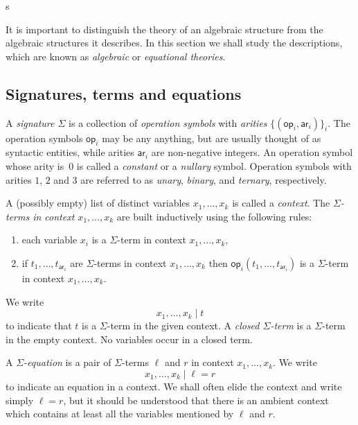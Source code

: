 s\documentclass{amsart}
\newcommand{\family}[2]{\{#1\}_{#2}} %
\newcommand{\op}[1]{\mathsf{op}_{#1}} %
\newcommand{\arity}[1]{\mathsf{ar}_{#1}} %
\begin{document}
It is important to distinguish the theory of an algebraic structure from the
algebraic structures it describes. In this section we shall study the
descriptions, which are known as \emph{algebraic} or \emph{equational theories}.

\subsection{Signatures, terms and equations}
\label{sec:signatures-equations}

A \emph{signature $\Sigma$} is a collection of \emph{operation symbols} with
\emph{arities} $\family{(\op{i}, \arity{i})}{i}$. The operation symbols
$\op{i}$ may be any anything, but are usually thought of as syntactic entities,
while arities $\arity{i}$ are non-negative integers. An operation symbol whose
arity is~$0$ is called a \emph{constant} or a \emph{nullary} symbol. Operation
symbols with arities $1$, $2$ and $3$ are referred to as \emph{unary},
\emph{binary}, and \emph{ternary}, respectively.

A (possibly empty) list of distinct variables $x_1, \ldots, x_k$ is called a
\emph{context}. The \emph{$\Sigma$-terms in context $x_1, \ldots, x_k$} are
built inductively using the following rules:
%
\begin{enumerate}
\item each variable $x_i$ is a $\Sigma$-term in context $x_1, \ldots, x_k$,
\item if $t_1, \ldots, t_{\arity{i}}$ are $\Sigma$-terms in context $x_1, \ldots, x_k$ then
  $\op{i}(t_1, \ldots, t_{\arity{i}})$ is a $\Sigma$-term in context $x_1, \ldots, x_k$.
\end{enumerate}
%
We write
%
\begin{equation*}
  x_1, \ldots, x_k \mid t
\end{equation*}
%
to indicate that $t$ is a $\Sigma$-term in the given context. A \emph{closed
  $\Sigma$-term} is a $\Sigma$-term in the empty context. No variables occur
in a closed term.

A \emph{$\Sigma$-equation} is a pair of $\Sigma$-terms $\ell$ and $r$ in context
$x_1, \ldots, x_k$. We write
%
\begin{equation*}
  x_1, \ldots, x_k \mid \ell = r
\end{equation*}
%
to indicate an equation in a context. We shall often elide the context and write simply
$\ell = r$, but it should be understood that there is an ambient context which contains at
least all the variables mentioned by $\ell$ and $r$.
\end{document}
